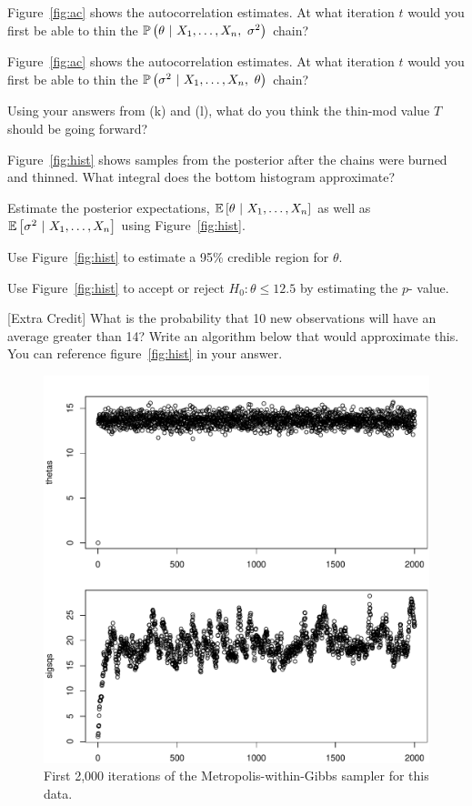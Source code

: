 \documentclass[12pt]{article}
\begin{document}
 Figure~\ref{fig:ac} shows the autocorrelation estimates. At what iteration $t$ would you first be able to thin the $\mathbb{P}\left(\theta~|~X_1, \ldots, X_n, ~\sigma^2\right)$ chain? %





 Figure~\ref{fig:ac} shows the autocorrelation estimates. At what iteration $t$ would you first be able to thin the $\mathbb{P}\left(\sigma^2~|~X_1, \ldots, X_n, ~\theta\right)$ chain? %

 Using your answers from (k) and (l), what do you think the thin-mod value $T$ should be going forward? %

 Figure~\ref{fig:hist} shows samples from the posterior after the chains were burned and thinned. What integral does the bottom histogram approximate?  %

 Estimate the posterior expectations, $\mathbb{E}\left[\theta~|~X_1, \ldots, X_n\right]$ as well as $\mathbb{E}\left[\sigma^2~|~X_1, \ldots, X_n\right]$ using Figure~\ref{fig:hist}.  %


 Use Figure~\ref{fig:hist} to estimate a 95\% credible region for $\theta$.  %

 Use Figure~\ref{fig:hist} to accept or reject $H_0: \theta \leq 12.5$ by estimating the $p$- value.  %


 [Extra Credit] What is the probability that 10 new observations will have an average greater than 14? Write an algorithm below that would approximate this. You can reference figure~\ref{fig:hist} in your answer. 

\eenum


\begin{figure}[htp]
\centering
\includegraphics[width=7in]{conv}
\caption{First 2,000 iterations of the Metropolis-within-Gibbs sampler for this data.}
\label{fig:conv}
\end{figure} %
\end{document}
